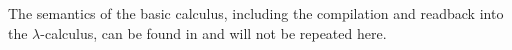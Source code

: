 \documentclass[a4paper,UKenglish,cleveref, autoref]{lipics-v2019}
\makeatletter
\newcommand\ALdots[1]{
        \path (#1) node[dot]{} -- +(-3pt,0) node[dot] {} -- +(3pt,0) node[dot]{};
}
\newcommand\ALbar[1]{
        \draw #1 +(2pt,1pt) -- +(-2pt,-1pt);
}
\newcommand\ALnodeT[4][.4]{
        \node [inner sep=4pt, minimum height=.6cm, minimum width=#1cm, shape=rectangle, style=draw, rounded corners] (#4) at (#3) {$#2$};
        \coordinate (#4_top) at ([above=1pt] #4.north);
        \coordinate (#4_bot) at (#4.south);
        \coordinate (#4_lbot) at ([left=3pt] #4.south);
        \coordinate (#4_rbot) at ([right=3pt] #4.south);
}
\newcommand\ALnodeL[2]{
        \node [inner sep=2pt] (#2) at (#1) {$\lambda$};
        \coordinate (#2_1) at (#2.north);
        \coordinate (#2_2) at (#2.south);
        \coordinate (#2_3) at (#2.east)
}
\newcommand\ALnodeA[2]{
        \node [inner sep=2pt] (#2) at (#1) {$@$};
        \coordinate (#2_1) at (#2.north);
        \coordinate (#2_2) at (#2.south);
        \coordinate (#2_3) at (#2.east)
}
\newcommand\ALnodeS[3][.5]{
        \path (#2) -- +(-#1,0.3) coordinate (#3_left) -- +(0,0.3) coordinate (#3_mid) -- +(#1,0.3) coordinate (#3_right) -- +(0,-0.3) coordinate (#3_tip);
        \draw ([above=1pt] #3_tip) -- ([below=1pt] #3_left) -- ([below=1pt] #3_right) -- cycle
}
\makeatother
\begin{document}

\noindent The semantics of the basic calculus, including the compilation and readback into the $\lambda$-calculus, can be found in \cite{gundersen2013atomic} and will not be repeated here.
\end{document}

